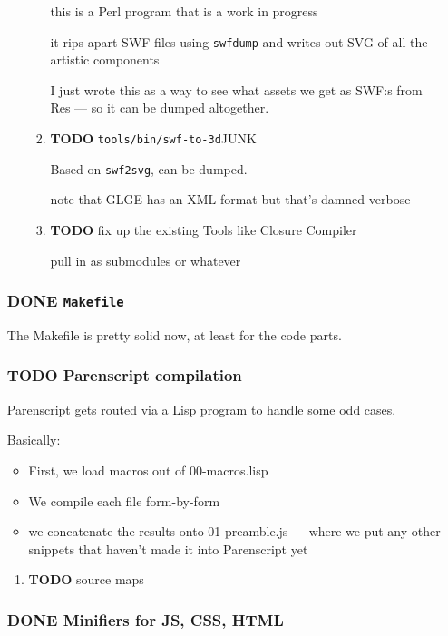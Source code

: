 \documentclass[11pt]{article}
\begin{document}
\begin{enumerate}
\begin{enumerate}
\begin{enumerate}
this is a Perl program that is a work in progress

it rips apart SWF files using \texttt{swfdump} and writes out SVG of all the
artistic components

I just wrote this as a way to see what assets we get as SWF:s from Res
--- so it can be dumped altogether.
\item {\bfseries\sffamily TODO} \texttt{tools/bin/swf-to-3d}\hfill{}\textsc{JUNK}
\label{sec-5-4-1-5-5}

Based on \texttt{swf2svg}, can be dumped.

note that GLGE has an XML format but that's damned verbose
\item {\bfseries\sffamily TODO} fix up the existing Tools like Closure Compiler
\label{sec-5-4-1-5-6}

pull in as submodules or whatever
\end{enumerate}
\end{enumerate}
\subsubsection{{\bfseries\sffamily DONE} \texttt{Makefile}}
\label{sec-5-4-2}

The Makefile is pretty solid now, at least for the code parts.
\subsubsection{{\bfseries\sffamily TODO} Parenscript compilation}
\label{sec-5-4-3}

Parenscript gets routed via a Lisp program to handle some odd cases.

Basically:

\begin{itemize}
\item First, we load macros out of 00-macros.lisp

\item We compile each file form-by-form

\item we concatenate the results onto 01-preamble.js — where we put any
other snippets that haven't made it into Parenscript yet
\end{itemize}

\begin{enumerate}
\item {\bfseries\sffamily TODO} source maps
\label{sec-5-4-3-1}
\end{enumerate}
\subsubsection{{\bfseries\sffamily DONE} Minifiers for JS, CSS, HTML}
\label{sec-5-4-4}


\end{enumerate}
\end{document}
